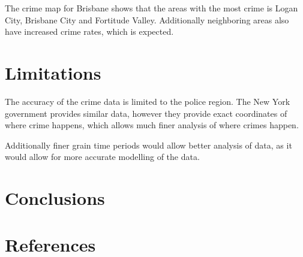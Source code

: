 \documentclass[]{article}
\begin{document}
The crime map for Brisbane shows that the areas with the most crime is Logan City, Brisbane City and Fortitude Valley.
Additionally neighboring areas also have increased crime rates, which is expected.

\section{Limitations}

The accuracy of the crime data is limited to the police region.
The New York government provides similar data, however they provide exact coordinates
of where crime happens, which allows much finer analysis of where crimes happen.

Additionally finer grain time periods would allow better analysis of data, as it would allow for more
accurate modelling of the data.


\section{Conclusions}



\section{References}



\end{document}
